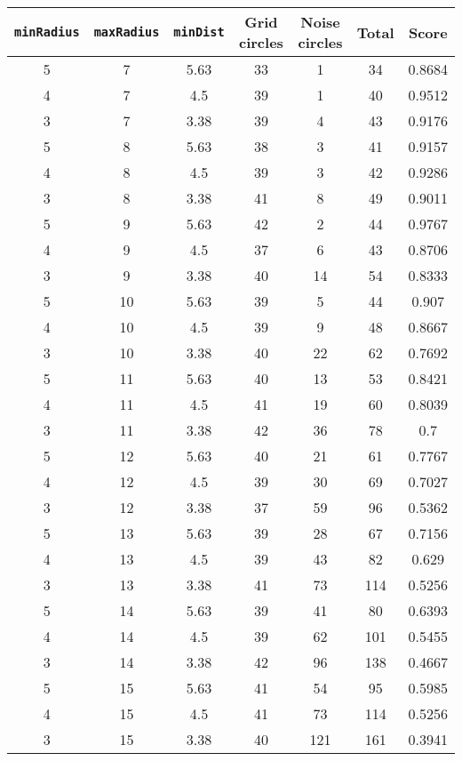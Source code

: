 \documentclass[letterpaper, 12pt]{article}
\begin{document}
\begin{longtable}{|c|c|c|c|c|c|c|}
\hline
\textbf{\texttt{minRadius}} & \textbf{\texttt{maxRadius}} & \textbf{\texttt{minDist}} & \textbf{Grid circles} & \textbf{Noise circles} & \textbf{Total} & \textbf{Score} \\
\hline
5 & 7 & 5.63 & 33 & 1 & 34 & 0.8684 \\
\hline
4 & 7 & 4.5 & 39 & 1 & 40 & 0.9512 \\
\hline
3 & 7 & 3.38 & 39 & 4 & 43 & 0.9176 \\
\hline
5 & 8 & 5.63 & 38 & 3 & 41 & 0.9157 \\
\hline
4 & 8 & 4.5 & 39 & 3 & 42 & 0.9286 \\
\hline
3 & 8 & 3.38 & 41 & 8 & 49 & 0.9011 \\
\hline
5 & 9 & 5.63 & 42 & 2 & 44 & 0.9767 \\
\hline
4 & 9 & 4.5 & 37 & 6 & 43 & 0.8706 \\
\hline
3 & 9 & 3.38 & 40 & 14 & 54 & 0.8333 \\
\hline
5 & 10 & 5.63 & 39 & 5 & 44 & 0.907 \\
\hline
4 & 10 & 4.5 & 39 & 9 & 48 & 0.8667 \\
\hline
3 & 10 & 3.38 & 40 & 22 & 62 & 0.7692 \\
\hline
5 & 11 & 5.63 & 40 & 13 & 53 & 0.8421 \\
\hline
4 & 11 & 4.5 & 41 & 19 & 60 & 0.8039 \\
\hline
3 & 11 & 3.38 & 42 & 36 & 78 & 0.7 \\
\hline
5 & 12 & 5.63 & 40 & 21 & 61 & 0.7767 \\
\hline
4 & 12 & 4.5 & 39 & 30 & 69 & 0.7027 \\
\hline
3 & 12 & 3.38 & 37 & 59 & 96 & 0.5362 \\
\hline
5 & 13 & 5.63 & 39 & 28 & 67 & 0.7156 \\
\hline
4 & 13 & 4.5 & 39 & 43 & 82 & 0.629 \\
\hline
3 & 13 & 3.38 & 41 & 73 & 114 & 0.5256 \\
\hline
5 & 14 & 5.63 & 39 & 41 & 80 & 0.6393 \\
\hline
4 & 14 & 4.5 & 39 & 62 & 101 & 0.5455 \\
\hline
3 & 14 & 3.38 & 42 & 96 & 138 & 0.4667 \\
\hline
5 & 15 & 5.63 & 41 & 54 & 95 & 0.5985 \\
\hline
4 & 15 & 4.5 & 41 & 73 & 114 & 0.5256 \\
\hline
3 & 15 & 3.38 & 40 & 121 & 161 & 0.3941 \\

\end{longtable}
\end{document}
